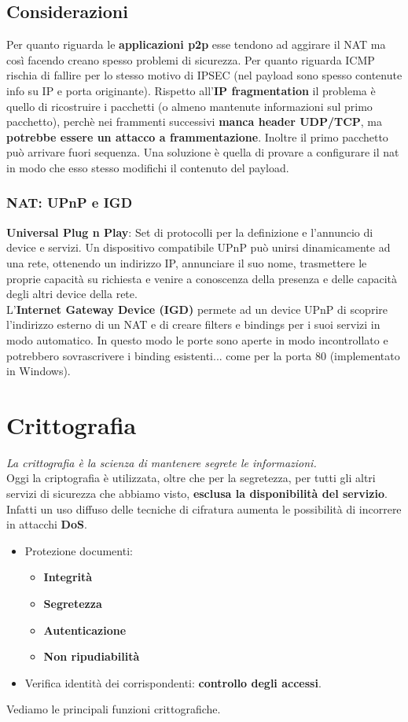 \documentclass[12pt]{article}
\begin{document}
			\subsection{Considerazioni}
				Per quanto riguarda le \textbf{applicazioni p2p} esse tendono ad aggirare il NAT ma così facendo creano spesso problemi di sicurezza. Per quanto riguarda ICMP rischia di fallire per lo stesso motivo di IPSEC (nel payload sono spesso contenute info su IP e porta originante). Rispetto all'\textbf{IP fragmentation} il problema è quello di ricostruire i pacchetti (o almeno mantenute informazioni sul primo pacchetto), perchè nei frammenti successivi \textbf{manca header UDP/TCP}, ma \textbf{potrebbe essere un attacco a frammentazione}. Inoltre il primo pacchetto può arrivare fuori sequenza. Una soluzione è quella di provare a configurare il nat in modo che esso stesso modifichi il contenuto del payload.
			\subsubsection{NAT: UPnP e IGD}
				\textbf{Universal Plug n Play}: Set di protocolli per la definizione  e l'annuncio di device e servizi. Un dispositivo compatibile UPnP può unirsi dinamicamente ad una rete, ottenendo un indirizzo IP, annunciare il suo nome, trasmettere le proprie capacità su richiesta e venire a conoscenza della presenza e delle capacità degli altri device della rete.\\
				L'\textbf{Internet Gateway Device (IGD) } permete ad un device UPnP di scoprire l'indirizzo esterno di un NAT e di creare filters e bindings per i suoi servizi in modo automatico. In questo modo le porte sono aperte in modo incontrollato  e potrebbero sovrascrivere i binding esistenti... come per la porta 80 (implementato in Windows). \newpage
	
	
	\section{Crittografia}
		\textit{La crittografia è la scienza di mantenere segrete le informazioni.}\\
		Oggi la criptografia è utilizzata, oltre che per la segretezza, per tutti gli altri servizi di sicurezza che abbiamo visto, \textbf{esclusa la disponibilità del servizio}. Infatti un uso diffuso delle tecniche di cifratura aumenta le possibilità di incorrere in attacchi \textbf{DoS}.
		\begin{itemize}
			\item Protezione documenti:
			\begin{itemize}
				\item \textbf{Integrità}
				\item \textbf{Segretezza}
				\item \textbf{Autenticazione}
				\item \textbf{Non ripudiabilità}
			\end{itemize}
			\item Verifica identità dei corrispondenti: \textbf{controllo degli accessi}. 
		\end{itemize}
		Vediamo le principali funzioni crittografiche.
\end{document}
